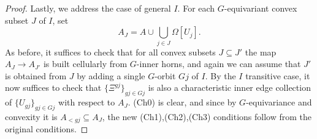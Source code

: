 \documentclass[a4paper,10pt
,draft
]{article}%
\begin{document}
\begin{proof}
Lastly, we address the case of general $I$.
For each $G$-equivariant convex subset $J$ of $I$, set
\[
	A_J = 
	A \cup \bigcup_{j \in J} \Omega[U_j].
\]
As before, it suffices to check that for all convex subsets
$J \subseteq J'$
the map $A_J \to A_{J'}$ is built cellularly from $G$-inner horns,
and again we can assume that $J'$ is obtained from $J$ by adding a single $G$-orbit $Gj$ of $I$.
By the $I$ transitive case, it now suffices to check that
$\{\Xi^{gj}\}_{gj \in Gj}$ is also a characteristic inner edge collection of $\{U_{g j}\}_{g j \in Gj}$ with respect to $A_J$.
(Ch0) is clear, and since by $G$-equivariance and convexity it is $A_{<gj} \subseteq A_J$,
the new (Ch1),(Ch2),(Ch3)
conditions follow from the original conditions.
\end{proof}
\end{document}
